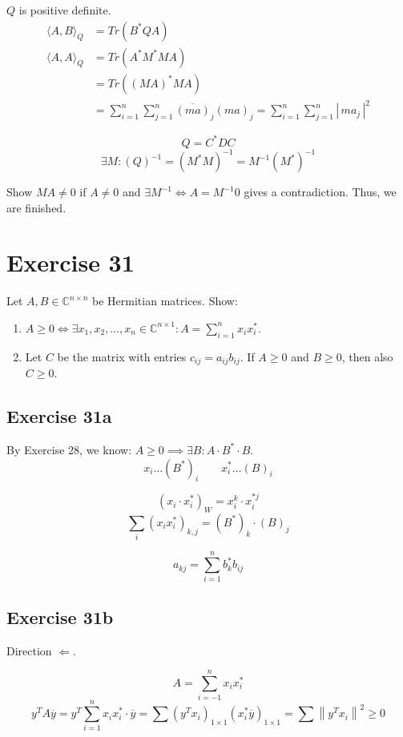 \documentclass[a4paper]{article}
\theoremstyle{definition}
\newcommand\card[1]{\left|\,#1\,\right|}
\newcommand\angel[1]{\langle#1\rangle}
\newcommand\norm[1]{\left\|{#1}\right\|}
\begin{document}
$Q$ is positive definite.
\begin{align*}
  \angel{A,B}_Q &= Tr(B^*QA) \\
  \angel{A,A}_Q &= Tr(A^* M^* M A) \\
    &= Tr((MA)^* MA) \\
    &= \sum_{i=1}^n \sum_{j=1}^n \overline{(ma)}_j (ma)_j = \sum_{i=1}^n \sum_{j=1}^n  \card{ma_j}^2
\end{align*}

\[ Q = C^* DC \]
\[ \exists M: (Q)^{-1} = (M^* M)^{-1} = M^{-1} (M^*)^{-1} \]

Show $MA \neq 0$ if $A \neq 0$ and $\exists M^{-1} \iff A = M^{-1} 0$ gives a contradiction. Thus, we are finished.

\section*{Exercise 31}
\begin{ex}
  Let $A, B \in \mathbb C^{n\times n}$ be Hermitian matrices. Show:
  \begin{enumerate}
    \item $A \geq 0 \iff \exists x_1, x_2, \dots, x_n \in \mathbb C^{n\times 1}: A = \sum_{i=1}^n x_i x_i^*$.
    \item Let $C$ be the matrix with entries $c_{ij} = a_{ij} b_{ij}$. If $A \geq 0$ and $B \geq 0$, then also $C \geq 0$.
  \end{enumerate}
\end{ex}

\subsection{Exercise 31a}

By Exercise 28, we know: $A \geq 0 \implies \exists B: A \cdot B^* \cdot B$.
\[ x_i \ldots (B^*)_i \qquad x_i^* \ldots (B)_i \]

\[ (x_i \cdot x_i^*)_W = x_i^k \cdot x_i^{*j} \]
\[ \sum_{i} (x_i x_i^*)_{k,j} = (B^*)_k \cdot (B)_j \]

\[ a_{kj} = \sum_{i=1}^n b_k^* b_{ij} \]

\subsection{Exercise 31b}

Direction $\Leftarrow$.

\[ A = \sum_{i=-1}^n x_i x_i^* \]
\[ y^T A \overline{y} = y^T \sum_{i=1}^n x_i x_i^* \cdot \overline{y} = \sum (y^T x_i)_{1\times 1} (x_i^* \overline{y})_{1 \times 1} = \sum \norm{y^T x_i}^2 \geq 0 \]
\end{document}
